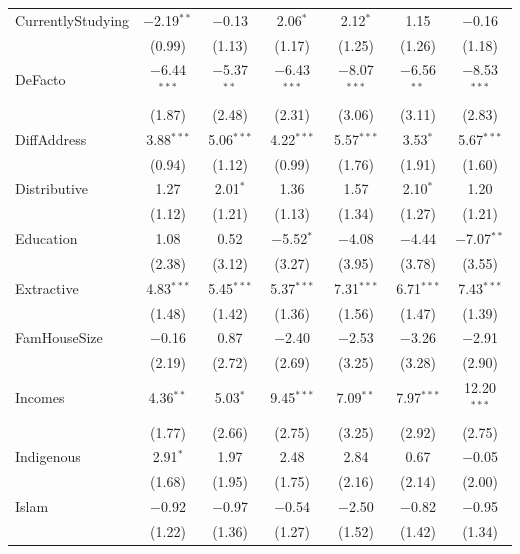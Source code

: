 \documentclass[11pt,a4paper,]{article}
\begin{document}
\begin{table}[!htbp]
\begin{tabular}{@{\extracolsep{1pt}}lcccccc}
 CurrentlyStudying & $-$2.19$^{**}$ & $-$0.13 & 2.06$^{*}$ & 2.12$^{*}$ & 1.15 & $-$0.16 \\ 
  & (0.99) & (1.13) & (1.17) & (1.25) & (1.26) & (1.18) \\ 

 DeFacto & $-$6.44$^{***}$ & $-$5.37$^{**}$ & $-$6.43$^{***}$ & $-$8.07$^{***}$ & $-$6.56$^{**}$ & $-$8.53$^{***}$ \\ 
  & (1.87) & (2.48) & (2.31) & (3.06) & (3.11) & (2.83) \\ 

 DiffAddress & 3.88$^{***}$ & 5.06$^{***}$ & 4.22$^{***}$ & 5.57$^{***}$ & 3.53$^{*}$ & 5.67$^{***}$ \\ 
  & (0.94) & (1.12) & (0.99) & (1.76) & (1.91) & (1.60) \\ 

 Distributive & 1.27 & 2.01$^{*}$ & 1.36 & 1.57 & 2.10$^{*}$ & 1.20 \\ 
  & (1.12) & (1.21) & (1.13) & (1.34) & (1.27) & (1.21) \\ 

 Education & 1.08 & 0.52 & $-$5.52$^{*}$ & $-$4.08 & $-$4.44 & $-$7.07$^{**}$ \\ 
  & (2.38) & (3.12) & (3.27) & (3.95) & (3.78) & (3.55) \\ 

 Extractive & 4.83$^{***}$ & 5.45$^{***}$ & 5.37$^{***}$ & 7.31$^{***}$ & 6.71$^{***}$ & 7.43$^{***}$ \\ 
  & (1.48) & (1.42) & (1.36) & (1.56) & (1.47) & (1.39) \\ 

 FamHouseSize & $-$0.16 & 0.87 & $-$2.40 & $-$2.53 & $-$3.26 & $-$2.91 \\ 
  & (2.19) & (2.72) & (2.69) & (3.25) & (3.28) & (2.90) \\ 

 Incomes & 4.36$^{**}$ & 5.03$^{*}$ & 9.45$^{***}$ & 7.09$^{**}$ & 7.97$^{***}$ & 12.20$^{***}$ \\ 
  & (1.77) & (2.66) & (2.75) & (3.25) & (2.92) & (2.75) \\ 

 Indigenous & 2.91$^{*}$ & 1.97 & 2.48 & 2.84 & 0.67 & $-$0.05 \\ 
  & (1.68) & (1.95) & (1.75) & (2.16) & (2.14) & (2.00) \\ 

 Islam & $-$0.92 & $-$0.97 & $-$0.54 & $-$2.50 & $-$0.82 & $-$0.95 \\ 
  & (1.22) & (1.36) & (1.27) & (1.52) & (1.42) & (1.34) \\ 


\end{tabular}
\end{table}
\end{document}
